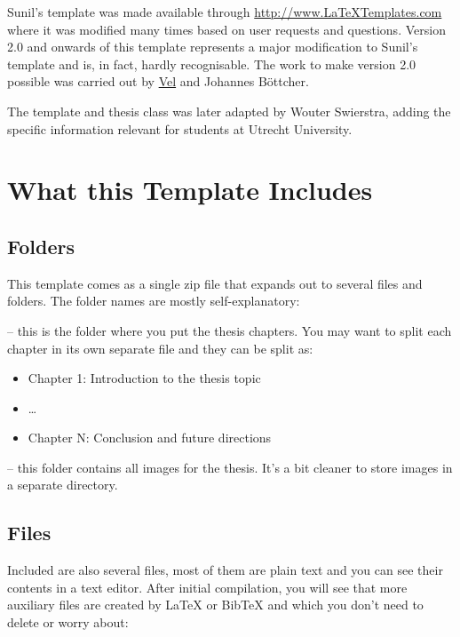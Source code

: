 Sunil's template was made available through
\url{http://www.LaTeXTemplates.com} where it was modified many times
based on user requests and questions. Version 2.0 and onwards of this
template represents a major modification to Sunil's template and is, in
fact, hardly recognisable. The work to make version 2.0 possible was
carried out by \href{mailto:vel@latextemplates.com}{Vel} and Johannes
Böttcher.

The template and thesis class was later adapted by Wouter Swierstra,
adding the specific information relevant for students at Utrecht
University.


\section{What this Template Includes}

\subsection{Folders}

This template comes as a single zip file that expands out to several
files and folders. The folder names are mostly self-explanatory:

 -- this is the folder where you put the thesis
chapters. You may want to split each chapter in its own separate
 file and they can be split as:
\begin{itemize}
\item Chapter 1: Introduction to the thesis topic
\item \ldots
\item Chapter N: Conclusion and future directions
\end{itemize}

 -- this folder contains all images for the thesis. It's a
bit cleaner to store images in a separate directory.

\subsection{Files}

Included are also several files, most of them are plain text and you can
see their contents in a text editor. After initial compilation, you will
see that more auxiliary files are created by \LaTeX{} or BibTeX and
which you don't need to delete or worry about:

